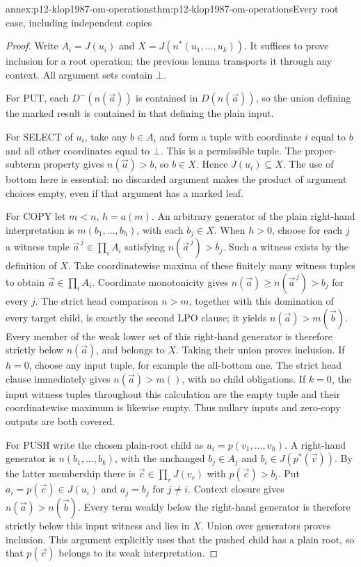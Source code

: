 \begin{annexitem}{annex:p12-klop1987-om-operations}{thm:p12-klop1987-om-operations}{Every root case, including independent copies}
\begin{proof}
Write \(A_i=J(u_i)\) and
\(X=J(n^*(u_1,\ldots,u_k))\). It suffices to prove inclusion
for a root operation; the previous lemma transports it through any
context. All argument sets contain \(\bot\).

For PUT, each \(D^-(n(\vec a))\) is contained in
\(D(n(\vec a))\), so the union defining the marked result is
contained in that defining the plain input.

For SELECT of \(u_i\), take any \(b\in A_i\) and form a
tuple with coordinate \(i\) equal to \(b\) and all other
coordinates equal to \(\bot\). This is a permissible tuple.
The proper-subterm property gives \(n(\vec a)>b\), so
\(b\in X\). Hence \(J(u_i)\subseteq X\). The use of
bottom here is essential: no discarded argument makes the product
of argument choices empty, even if that argument has a marked leaf.

For COPY let \(m<n\), \(h=a(m)\). An arbitrary generator of
the plain right-hand interpretation is
\(m(b_1,\ldots,b_h)\), with each \(b_j\in X\).
When \(h>0\), choose for each \(j\) a witness tuple
\(\vec a^{\,j}\in\prod_i A_i\) satisfying
\(n(\vec a^{\,j})>b_j\). Such a witness exists by the
definition of \(X\). Take coordinatewise maxima of these finitely
many witness tuples to obtain \(\vec a\in\prod_i A_i\).
Coordinate monotonicity gives
\(n(\vec a)\geq n(\vec a^{\,j})>b_j\) for every \(j\).
The strict head comparison \(n>m\), together with this domination
of every target child, is exactly the second LPO clause; it yields
\(n(\vec a)>m(\vec b)\). Every member of the weak lower set
of this right-hand generator is therefore strictly below
\(n(\vec a)\), and belongs to \(X\). Taking their union
proves inclusion. If \(h=0\), choose any input tuple, for example
the all-bottom one. The strict head clause immediately gives
\(n(\vec a)>m()\), with no child obligations. If \(k=0\),
the input witness tuples throughout this calculation are the empty
tuple and their coordinatewise maximum is likewise empty. Thus
nullary inputs and zero-copy outputs are both covered.

For PUSH write the chosen plain-root child as
\(u_i=p(v_1,\ldots,v_h)\). A right-hand generator is
\(n(b_1,\ldots,b_k)\), with the unchanged \(b_j\in A_j\)
and \(b_i\in J(p^*(\vec v))\). By the latter membership
there is \(\vec c\in\prod_r J(v_r)\) with
\(p(\vec c)>b_i\). Put \(a_i=p(\vec c)\in J(u_i)\)
and \(a_j=b_j\) for \(j\ne i\). Context closure gives
\(n(\vec a)>n(\vec b)\). Every term weakly below the
right-hand generator is therefore strictly below this input witness
and lies in \(X\). Union over generators proves inclusion.
This argument explicitly uses that the pushed child has a plain
root, so that \(p(\vec c)\) belongs to its weak interpretation.


\end{proof}
\end{annexitem}
